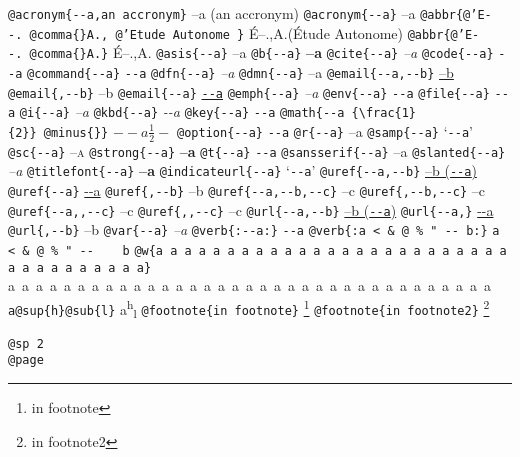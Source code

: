 \documentclass{book}
\newcommand\Texinfocommandstyletextcite[1]{{\normalfont{}\textsl{#1}}}%
\newcommand\Texinfocommandstyletextkbd[1]{{\ttfamily\textsl{#1}}}%
\newcommand\Texinfocommandstyletextvar[1]{{\normalfont{}\textsl{#1}}}%
\renewcommand{\_}{\Texinfounderscore\discretionary{}{}{}}
\begin{document}
\texttt{@acronym\{{-}{-}a,an accronym\}} --a (an accronym)
\texttt{@acronym\{{-}{-}a\}} --a
\texttt{@abbr\{@'E{-}{-}.\ @comma\{\}A.,\ @'Etude Autonome \}} \'{E}--.\@ ,A.\@ (\'{E}tude Autonome)
\texttt{@abbr\{@'E{-}{-}.\ @comma\{\}A.\}} \'{E}--.\@ ,A.\@
\texttt{@asis\{{-}{-}a\}} --a
\texttt{@b\{{-}{-}a\}} \textbf{--a}
\texttt{@cite\{{-}{-}a\}} \Texinfocommandstyletextcite{--a}
\texttt{@code\{{-}{-}a\}} \texttt{{-}{-}a}
\texttt{@command\{{-}{-}a\}} \texttt{{-}{-}a}
\texttt{@dfn\{{-}{-}a\}} \textsl{--a}
\texttt{@dmn\{{-}{-}a\}} \thinspace --a
\texttt{@email\{{-}{-}a,{-}{-}b\}} \href{mailto:--a}{--b}
\texttt{@email\{,{-}{-}b\}} --b
\texttt{@email\{{-}{-}a\}} \href{mailto:--a}{\nolinkurl{--a}}
\texttt{@emph\{{-}{-}a\}} \emph{--a}
\texttt{@env\{{-}{-}a\}} \texttt{{-}{-}a}
\texttt{@file\{{-}{-}a\}} \texttt{{-}{-}a}
\texttt{@i\{{-}{-}a\}} \textit{--a}
\texttt{@kbd\{{-}{-}a\}} \Texinfocommandstyletextkbd{{-}{-}a}
\texttt{@key\{{-}{-}a\}} \texttt{{-}{-}a}
\texttt{@math\{{-}{-}a \{\textbackslash{}frac\{1\}\{2\}\}\ @minus\{\}\}} $--a {\frac{1}{2}} -$
\texttt{@option\{{-}{-}a\}} \texttt{{-}{-}a}
\texttt{@r\{{-}{-}a\}} \textnormal{--a}
\texttt{@samp\{{-}{-}a\}} `\texttt{{-}{-}a}'
\texttt{@sc\{{-}{-}a\}} \textsc{--a}
\texttt{@strong\{{-}{-}a\}} \textbf{--a}
\texttt{@t\{{-}{-}a\}} \texttt{{-}{-}a}
\texttt{@sansserif\{{-}{-}a\}} \textsf{--a}
\texttt{@slanted\{{-}{-}a\}} \textsl{--a}
\texttt{@titlefont\{{-}{-}a\}} {\huge \bfseries --a}
\texttt{@indicateurl\{{-}{-}a\}} `\texttt{{-}{-}a}'
\texttt{@uref\{{-}{-}a,{-}{-}b\}} \href{--a}{--b (\nolinkurl{--a})}
\texttt{@uref\{{-}{-}a\}} \url{--a}
\texttt{@uref\{,{-}{-}b\}} --b
\texttt{@uref\{{-}{-}a,{-}{-}b,{-}{-}c\}} --c
\texttt{@uref\{,{-}{-}b,{-}{-}c\}} --c
\texttt{@uref\{{-}{-}a{,}{,}{-}{-}c\}} --c
\texttt{@uref\{{,}{,}{-}{-}c\}} --c
\texttt{@url\{{-}{-}a,{-}{-}b\}} \href{--a}{--b (\nolinkurl{--a})}
\texttt{@url\{{-}{-}a,\}} \url{--a}
\texttt{@url\{,{-}{-}b\}} --b
\texttt{@var\{{-}{-}a\}} \Texinfocommandstyletextvar{--a}
\texttt{@verb\{:{-}{-}a:\}} \verb:--a:
\texttt{@verb\{:a  < \& @\ \% " {-}{-}    b:\}} \verb:a  < & @ % " --    b:
\texttt{@w\{a a a a a a a a a a a a a a a a a a a a a a a a a a a a a a a a a a a\}} \hbox{a a a a a a a a a a a a a a a a a a a a a a a a a a a a a a a a a a a}
\texttt{a@sup\{h\}@sub\{l\}} a\textsuperscript{h}\textsubscript{l}
\texttt{@footnote\{in footnote\}} \footnote{in footnote}
\texttt{@footnote\{in footnote2\}} \footnote{in footnote2}

\texttt{@sp 2}\leavevmode{}\\
\baselineskip %
\texttt{@page}\leavevmode{}\\
\newpage{}%
\phantom{blabla}%
\end{document}
